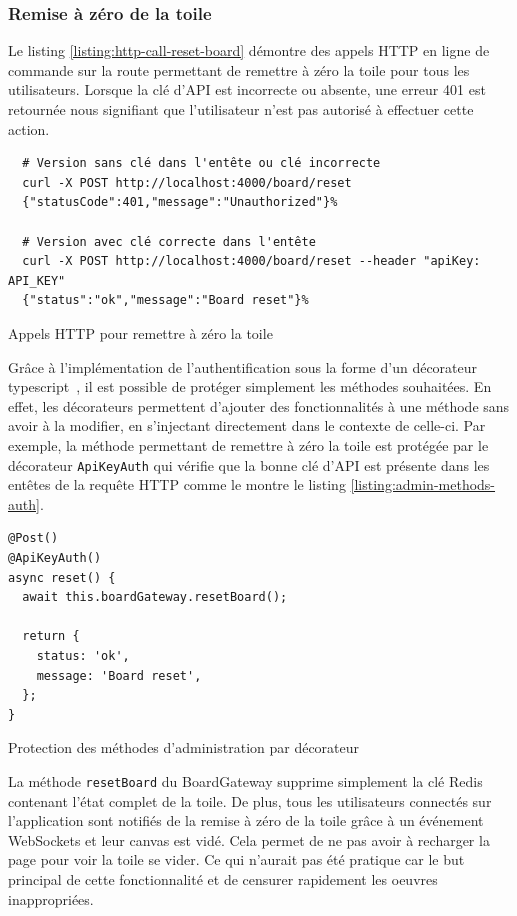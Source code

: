 \subsubsection{Remise à zéro de la toile}

Le listing \ref{listing:http-call-reset-board} démontre des appels HTTP en ligne de commande sur la route permettant de remettre à zéro la toile pour tous les utilisateurs. Lorsque la clé d'API est incorrecte ou absente, une erreur 401 est retournée nous signifiant que l'utilisateur n'est pas autorisé à effectuer cette action.

\begin{listing}[h]
  \begin{verbatim}
  # Version sans clé dans l'entête ou clé incorrecte
  curl -X POST http://localhost:4000/board/reset
  {"statusCode":401,"message":"Unauthorized"}%

  # Version avec clé correcte dans l'entête
  curl -X POST http://localhost:4000/board/reset --header "apiKey: API_KEY"
  {"status":"ok","message":"Board reset"}%
\end{verbatim}
  \caption{Appels HTTP pour remettre à zéro la toile}
  \label{listing:http-call-reset-board}
\end{listing}

Grâce à l'implémentation de l'authentification sous la forme d'un décorateur \gls{typescript}~\cite{typescript-decorators}, il est possible de protéger simplement les méthodes souhaitées. En effet, les décorateurs permettent d'ajouter des fonctionnalités à une méthode sans avoir à la modifier, en s'injectant directement dans le contexte de celle-ci. Par exemple, la méthode permettant de remettre à zéro la toile est protégée par le décorateur \texttt{ApiKeyAuth} qui vérifie que la bonne clé d'API est présente dans les entêtes de la requête HTTP comme le montre le listing \ref{listing:admin-methods-auth}.

\begin{listing}[h]
  \begin{verbatim}
@Post()
@ApiKeyAuth()
async reset() {
  await this.boardGateway.resetBoard();

  return {
    status: 'ok',
    message: 'Board reset',
  };
}
\end{verbatim}
  \caption{Protection des méthodes d'administration par décorateur}
  \label{listing:admin-methods-auth}
\end{listing}

La méthode \texttt{resetBoard} du BoardGateway supprime simplement la clé Redis contenant l'état complet de la toile. De plus, tous les utilisateurs connectés sur l'application sont notifiés de la remise à zéro de la toile grâce à un événement WebSockets et leur canvas est vidé. Cela permet de ne pas avoir à recharger la page pour voir la toile se vider. Ce qui n'aurait pas été pratique car le but principal de cette fonctionnalité et de censurer rapidement les oeuvres inappropriées.

